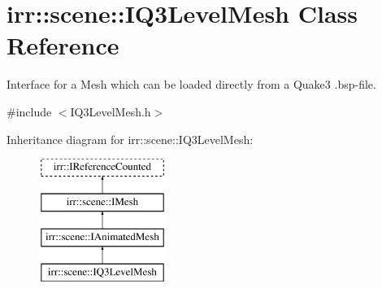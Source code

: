 \hypertarget{classirr_1_1scene_1_1IQ3LevelMesh}{}\section{irr\+:\+:scene\+:\+:I\+Q3\+Level\+Mesh Class Reference}
\label{classirr_1_1scene_1_1IQ3LevelMesh}


Interface for a Mesh which can be loaded directly from a Quake3 .bsp-\/file.  




{\ttfamily \#include $<$I\+Q3\+Level\+Mesh.\+h$>$}

Inheritance diagram for irr\+:\+:scene\+:\+:I\+Q3\+Level\+Mesh\+:\begin{figure}[H]
\begin{center}
\leavevmode
\includegraphics[height=4.000000cm]{classirr_1_1scene_1_1IQ3LevelMesh}
\end{center}
\end{figure}
